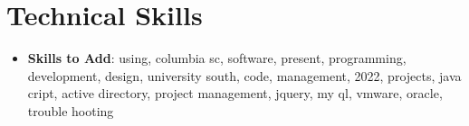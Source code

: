 \documentclass[letterpaper,11pt]{article}
\begin{document}
\section{Technical Skills}

\begin{itemize}[leftmargin=0.15in]
\item \textbf{Skills to Add}{: using, columbia sc, software, present, programming, development, design, university south, code, management, 2022, projects, java cript, active directory, project management, jquery, my ql, vmware, oracle, trouble hooting}
\end{itemize}
\end{document}
